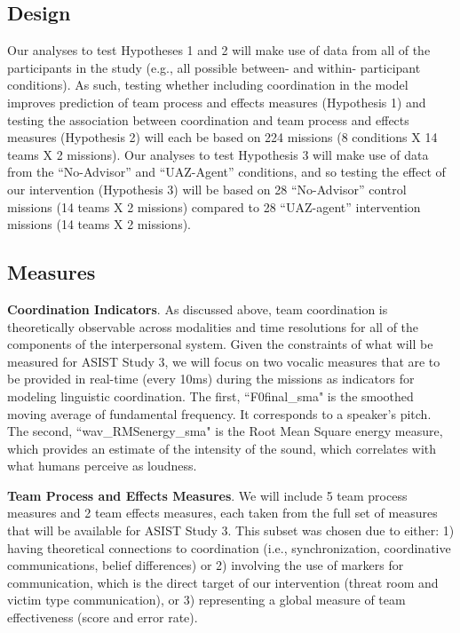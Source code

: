 \subsection{Design}
Our analyses to test Hypotheses 1 and 2 will make use of data from all of the
participants in the study (e.g., all possible between- and within- participant
conditions). As such, testing whether including coordination in the model
improves prediction of team process and effects measures (Hypothesis 1) and
testing the association between coordination and team process and effects
measures (Hypothesis 2) will each be based on 224 missions (8 conditions X 14
teams X 2 missions). Our analyses to test Hypothesis 3 will make use of data
from the ``No-Advisor” and ``UAZ-Agent” conditions, and so testing the effect of
our intervention (Hypothesis 3) will be based on 28 ``No-Advisor” control
missions (14 teams X 2 missions) compared to 28 ``UAZ-agent” intervention
missions (14 teams X 2 missions).

\subsection{Measures}
\textbf{Coordination Indicators}. As discussed above, team coordination is
theoretically observable across modalities and time resolutions for all of the
components of the interpersonal system. Given the constraints of what will be
measured for ASIST Study 3, we will focus on two vocalic measures that are to be
provided in real-time (every 10ms) during the missions as indicators for
modeling linguistic coordination. The first, ``F0final\_sma" is the smoothed
moving average of fundamental frequency. It corresponds to a speaker’s pitch.
The second, ``wav\_RMSenergy\_sma" is the Root Mean Square energy measure, which
provides an estimate of the intensity of the sound, which correlates with what
humans perceive as loudness. 

\textbf{Team Process and Effects Measures}. We will include 5 team process
measures and 2 team effects measures, each taken from the full set of measures
that will be available for ASIST Study 3. This subset was chosen due to either:
1) having theoretical connections to coordination (i.e., synchronization,
coordinative communications, belief differences) or 2) involving the use of
markers for communication, which is the direct target of our intervention
(threat room and victim type communication), or 3) representing a global measure
of team effectiveness (score and error rate).

